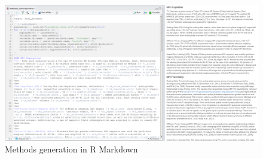 \begin{figure}
	\begin{center}
		\includegraphics[width=7in]{../images/MethodsGenerator.png}
		\caption{Methods generation in R Markdown}
                \label{fig:methods}
	\end{center}
\end{figure}